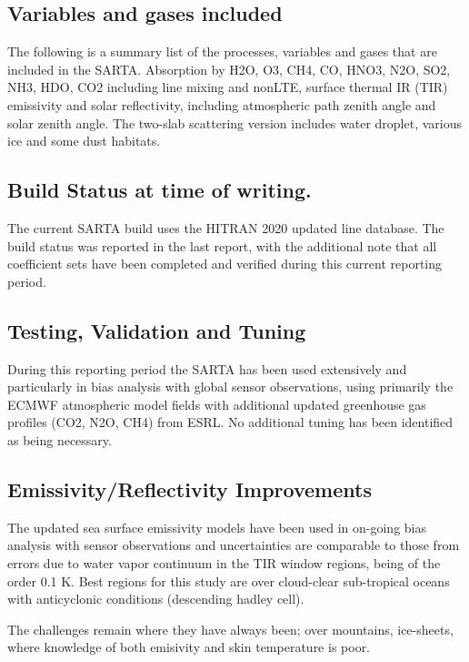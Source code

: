 \documentclass[11pt,twocolumn]{article}
\begin{document}
\subsection{Variables and gases included}
\label{sec:orgdf62763}

The following is a summary list of the processes, variables and gases
that are included in the SARTA.
Absorption by H2O, O3, CH4, CO, HNO3, N2O, SO2, NH3, HDO, CO2 including line mixing
and nonLTE,
surface thermal IR (TIR) emissivity and solar reflectivity, including atmospheric
path zenith angle
and solar zenith angle. The two-slab scattering version includes water droplet,
various ice and some dust habitats.

\subsection{Build Status at time of writing.}
\label{sec:org470fa20}

The current SARTA build uses the HITRAN 2020 updated line database.
The build status was reported in the last report, with the additional note
that all coefficient sets have been completed and verified during this
current reporting period.


\subsection{Testing, Validation and Tuning}
\label{sec:org3553705}

During this reporting period the SARTA has been used extensively and particularly
in bias analysis with global sensor observations, using
primarily the ECMWF atmospheric model fields with additional updated
greenhouse gas profiles (CO2, N2O, CH4) from ESRL. No additional tuning
has been identified as being necessary.


\subsection{Emissivity/Reflectivity Improvements}
\label{sec:org4cef460}

The updated sea surface emissivity models have been used in on-going bias analysis
with sensor observations and uncertainties are comparable to those from errors
due to water vapor continuum in the TIR window regions, being of the order 0.1 K.
Best regions for this study are over cloud-clear sub-tropical oceans with anticyclonic
conditions (descending hadley cell).

The challenges remain where they have always been; over mountains, ice-sheets, where
knowledge of both emisivity and skin temperature is poor.
\end{document}
